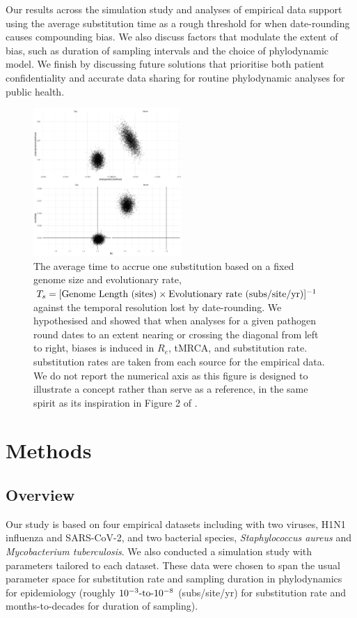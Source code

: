 \documentclass[12pt]{article}
\begin{document}
\begin{spacing}{2}
 Our results across the simulation study and analyses of empirical data support using the average substitution time as a rough threshold for when date-rounding causes compounding bias. We also discuss factors that modulate the extent of bias, such as duration of sampling intervals and the choice of phylodynamic model. We finish by discussing future solutions that prioritise both patient confidentiality and accurate data sharing for routine phylodynamic analyses for public health.

\begin{figure}[H]
    \centering
    \includegraphics[width = 0.5\textwidth]{plane.pdf}
    \caption{The average time to accrue one substitution based on a fixed genome size and evolutionary rate, $T_s = [\textnormal{Genome Length (sites)}\times\textnormal{Evolutionary rate (subs/site/yr)}]^{-1}$ against the temporal resolution lost by date-rounding. We hypothesised and showed that when analyses for a given pathogen round dates to an extent nearing or crossing the diagonal from left to right, biases is induced in $R_e$, tMRCA, and substitution rate. substitution rates are taken from each source for the empirical data. We do not report the numerical axis as this figure is designed to illustrate a concept rather than serve as a reference, in the same spirit as its inspiration in Figure 2 of \citet{biek_measurably_2015}.}
    \label{fig:plane}
\end{figure}

\section*{Methods}
\subsection*{Overview}
Our study is based on four empirical datasets including with two viruses, H1N1 influenza and SARS-CoV-2, and two bacterial species, \textit{Staphylococcus aureus} and \textit{Mycobacterium tuberculosis}. We also conducted a  simulation study with parameters tailored to each dataset. These data were chosen to span the usual parameter space for substitution rate and sampling duration in phylodynamics for epidemiology (roughly $10^{-3}\textnormal{-to-}10^{-8}$ (subs/site/yr) for substitution rate and months-to-decades for duration of sampling).


\end{spacing}
\end{document}
